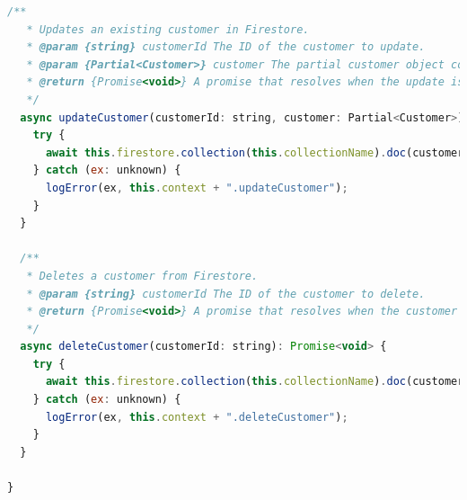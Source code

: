 \begin{lstlisting}[language=JavaScript, caption={Model class in the back-end}]
  /**
   * Updates an existing customer in Firestore.
   * @param {string} customerId The ID of the customer to update.
   * @param {Partial<Customer>} customer The partial customer object containing updates.
   * @return {Promise<void>} A promise that resolves when the update is complete.
   */
  async updateCustomer(customerId: string, customer: Partial<Customer>): Promise<void> {
    try {
      await this.firestore.collection(this.collectionName).doc(customerId).update(customer);
    } catch (ex: unknown) {
      logError(ex, this.context + ".updateCustomer");
    }
  }

  /**
   * Deletes a customer from Firestore.
   * @param {string} customerId The ID of the customer to delete.
   * @return {Promise<void>} A promise that resolves when the customer is successfully deleted.
   */
  async deleteCustomer(customerId: string): Promise<void> {
    try {
      await this.firestore.collection(this.collectionName).doc(customerId).delete();
    } catch (ex: unknown) {
      logError(ex, this.context + ".deleteCustomer");
    }
  }

}
\end{lstlisting}
